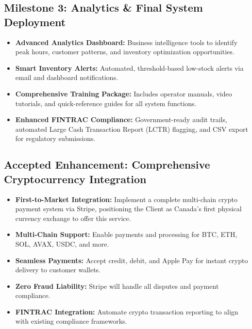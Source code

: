 \documentclass[11pt, a4paper]{article}
\begin{document}
\subsection{Milestone 3: Analytics \& Final System Deployment}
\begin{itemize}[leftmargin=*]
    \item \textbf{Advanced Analytics Dashboard:} Business intelligence tools to identify peak hours, customer patterns, and inventory optimization opportunities.
    \item \textbf{Smart Inventory Alerts:} Automated, threshold-based low-stock alerts via email and dashboard notifications.
    \item \textbf{Comprehensive Training Package:} Includes operator manuals, video tutorials, and quick-reference guides for all system functions.
    \item \textbf{Enhanced FINTRAC Compliance:} Government-ready audit trails, automated Large Cash Transaction Report (LCTR) flagging, and CSV export for regulatory submissions.
\end{itemize}

\subsection{Accepted Enhancement: Comprehensive Cryptocurrency Integration}
\begin{itemize}[leftmargin=*]
    \item \textbf{First-to-Market Integration:} Implement a complete multi-chain crypto payment system via Stripe, positioning the Client as Canada's first physical currency exchange to offer this service.
    \item \textbf{Multi-Chain Support:} Enable payments and processing for BTC, ETH, SOL, AVAX, USDC, and more.
    \item \textbf{Seamless Payments:} Accept credit, debit, and Apple Pay for instant crypto delivery to customer wallets.
    \item \textbf{Zero Fraud Liability:} Stripe will handle all disputes and payment compliance.
    \item \textbf{FINTRAC Integration:} Automate crypto transaction reporting to align with existing compliance frameworks.
\end{itemize}

\end{document}
